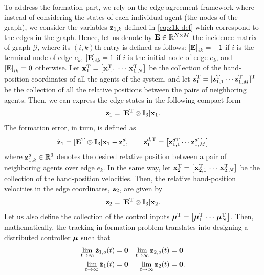 To address the formation part, we rely on the edge-agreement framework \cite{mesbahi_graph_2010} where instead of considering the states of each individual agent (the nodes of the graph), we consider the variables $\mathbf{z}_{1, k}$ defined in \eqref{eq:z1k-def} which correspond to the edges in the graph.
Hence, let us denote by $\mathbf{E} \in \mathbb{R}^{N\times M}$ the incidence matrix of graph $\mathcal{G}$, where its $(i,k)$th entry is defined as follows: $\left[\mathbf{E}\right]_{ik} = -1$ if $i$ is the terminal node of edge $e_k$, $\left[\mathbf{E}\right]_{ik} = 1$ if $i$ is the initial node of edge $e_k$, and $\left[\mathbf{E}\right]_{ik} = 0$ otherwise.
Let $\mathbf{x}_1^{\mathrm{T}} = \left[\mathbf{x}_{1, 1}^{\mathrm{T}}\,\cdots\,\mathbf{x}_{1, N}^{\mathrm{T}}\right]$ be the collection of the hand-position coordinates of all the agents of the system, and let $\mathbf{z}_1^{\mathrm{T}} = [\mathbf{z}_{1, 1}^{\mathrm{T}}\cdots \mathbf{z}_{1, M}^{\mathrm{T}}]^{\mathrm{T}}$ be the collection of all the relative positions between the pairs of neighboring agents.
Then, we can express the edge states in the following compact form
\begin{equation}\begin{aligned}\label{eq:z1-def}
\mathbf{z}_1= [\mathbf{E}^{\mathrm{T}} \otimes \mathbf{I}_3] \mathbf{x}_1.
\end{aligned}\end{equation}
The formation error, in turn, is defined as
\begin{equation}\begin{aligned}\label{eq:tildez1-def}
\tilde{\mathbf{z}}_1=[\mathbf{E}^{\mathrm{T}} \otimes \mathbf{I}_3] \mathbf{x}_1 - \mathbf{z}_1^d, \qquad
\mathbf{z}_1^{d, {\rm T}} = \left[\mathbf{z}_{1, 1}^{d{\rm T}}\cdots \mathbf{z}_{1, M}^{d{\rm T}}\right]
\end{aligned}\end{equation}
where $\mathbf{z}_{1, k}^d\in\mathbb{R}^{3}$ denotes the desired relative position between a pair of neighboring agents over edge $e_k$.
In the same way, let $\mathbf{x}_2^{\mathrm{T}}=\left[\mathbf{x}_{2, 1}^{\mathrm{T}}\,\cdots\,\mathbf{x}_{2, N}^{\mathrm{T}}\right]$ be the collection of the hand-position velocities.
Then, the relative hand-position velocities in the edge coordinates, $\mathbf{z}_2$, are given by
\begin{equation}\begin{aligned}\label{eq:z2-def}
\mathbf{z}_2=[\mathbf{E}^{\mathrm{T}} \otimes \mathbf{I}_3] \mathbf{x}_2.
\end{aligned}\end{equation}
Let us also define the collection of the control inputs $\bm{\mu}^{\mathrm{T}}=\left[\bm{\mu}_1^{\mathrm{T}}\,\cdots\,\bm{\mu}_N^{\mathrm{T}}\right]$.
Then, mathematically, the tracking-in-formation problem translates into designing a distributed controller $\bm{\mu}$ such that 
\begin{subequations}\label{n194}\begin{align}
	\lim\limits_{t \rightarrow \infty} \tilde{\mathbf{z}}_{1, o}(t) &= \mathbf{0} & \lim\limits_{t \rightarrow \infty} \mathbf{z}_{2, o}(t) &= \mathbf{0} \label{n194-a}\\
	\lim\limits_{t \rightarrow \infty} \tilde{\mathbf{z}}_1(t) &= \mathbf{0} & \lim\limits_{t \rightarrow \infty} \mathbf{z}_2(t) &= \mathbf{0}. \label{n194-b}
\end{align}\end{subequations}

